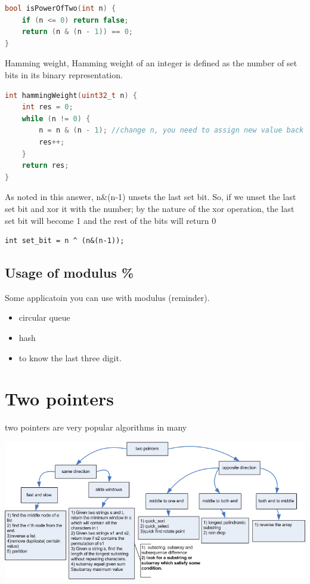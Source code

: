 \documentclass[a4paper,11pt,twoside]{book}
\begin{document}
\begin{lstlisting}[frame=single, language=c++]	
bool isPowerOfTwo(int n) {
	if (n <= 0) return false;
	return (n & (n - 1)) == 0;
}		
\end{lstlisting}	
	
	\par Hamming weight,  Hamming weight of an integer is defined as the number of set bits in its binary representation. 
\begin{lstlisting}[frame=single, language=c++]	
int hammingWeight(uint32_t n) {
	int res = 0;
	while (n != 0) {
		n = n & (n - 1); //change n, you need to assign new value back to n. 
		res++;
	}
	return res;
}	
\end{lstlisting}	

	\par As noted in this answer, n\&(n-1) unsets the last set bit.
So, if we unset the last set bit and xor it with the number; by the nature of the xor operation, the last set bit will become 1 and the rest of the bits will return 0
\begin{lstlisting}
int set_bit = n ^ (n&(n-1));
\end{lstlisting}


\subsection{Usage of modulus \%}

\par Some applicatoin you can use with modulus (reminder).
\begin{itemize}
\item circular queue
\item hash
\item to know the last three digit. 
\end{itemize}


\section{Two pointers}

\par two pointers are very popular algorithms in many 

\begin{center}
\includegraphics[scale=0.6]{pics/two_pointers.png}
\end{center}
\end{document}
